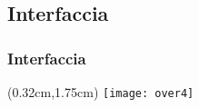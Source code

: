 \subsection{Interfaccia}
\begin{frame}
  \frametitle{Interfaccia}
  
  \begin{textblock*}{20cm}(0.32cm,1.75cm)
      \texttt{[image: over4]}
    \end{textblock*}
  
\end{frame}